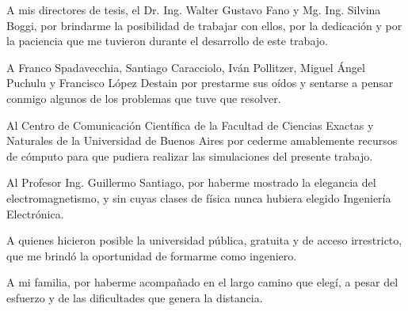 A mis directores de tesis, el Dr. Ing. Walter Gustavo Fano y Mg. Ing. Silvina Boggi, por brindarme la posibilidad de trabajar con ellos, por la dedicación y por la paciencia que me tuvieron durante el desarrollo de este trabajo.

A Franco Spadavecchia, Santiago Caracciolo, Iván Pollitzer, Miguel Ángel Puchulu y Francisco López Destain por prestarme sus oídos y sentarse a pensar conmigo algunos de los problemas que tuve que resolver.

Al Centro de Comunicación Científica de la Facultad de Ciencias Exactas y Naturales de la Universidad de Buenos Aires por cederme amablemente recursos de cómputo para que pudiera realizar las simulaciones del presente trabajo.

Al Profesor Ing. Guillermo Santiago, por haberme mostrado la elegancia del electromagnetismo, y sin cuyas clases de física nunca hubiera elegido Ingeniería Electrónica.

A quienes hicieron posible la universidad pública, gratuita y de acceso irrestricto, que me brindó la oportunidad de formarme como ingeniero.

A mi familia, por haberme acompañado en el largo camino que elegí, a pesar del esfuerzo y de las dificultades que genera la distancia.